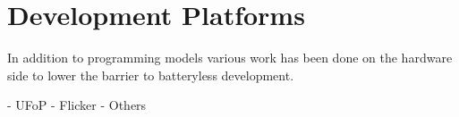 \section{Development Platforms} %
\label{sec:development_platforms}

In addition to programming models various work has been done on the hardware side to lower the barrier to batteryless development.

- UFoP \cite{ufop}
- Flicker \cite{flicker}
- Others
